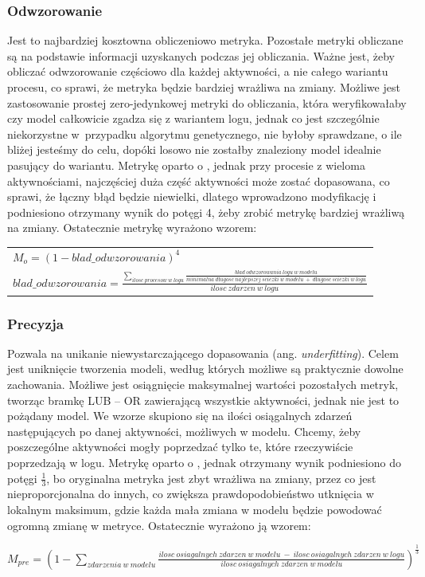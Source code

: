 \subsubsection{Odwzorowanie} 
Jest to najbardziej kosztowna obliczeniowo metryka. Pozostałe metryki obliczane są na podstawie informacji uzyskanych podczas jej obliczania. Ważne jest, żeby obliczać odwzorowanie częściowo dla każdej aktywności, a nie całego wariantu procesu, co sprawi, że metryka będzie bardziej wrażliwa na zmiany. Możliwe jest zastosowanie prostej zero-jedynkowej metryki do obliczania, która weryfikowałaby czy model całkowicie zgadza się z wariantem logu, jednak co jest szczególnie niekorzystne w~przypadku algorytmu genetycznego, nie byłoby sprawdzane, o ile bliżej jesteśmy do celu, dopóki losowo nie zostałby znaleziony model idealnie pasujący do wariantu. Metrykę oparto o \cite{metric-calculation}, jednak przy procesie z wieloma aktywnościami, najczęściej duża część aktywności może zostać dopasowana, co sprawi, że łączny błąd będzie niewielki, dlatego wprowadzono modyfikację i podniesiono otrzymany wynik do potęgi 4, żeby zrobić metrykę bardziej wrażliwą na zmiany. Ostatecznie metrykę wyrażono wzorem:
\begin{center}
\begin{tabular}{l}
$M_o = (1 - blad\_odwzorowania)^4$ \\
$blad\_odwzorowania = \frac{\sum_{ilosc\ procesow\ w\ logu} \frac{blad\ odwzorowania\ logu\ w\ modelu}{minimalna\ długosc\ najlepszej\ sciezki\ w\ modelu\ +\ długosc\ sciezki\ w\ logu}}{ilosc\ zdarzen \ w\ logu}$
\end{tabular}
\end{center}
\subsubsection{Precyzja} 
Pozwala na unikanie niewystarczającego dopasowania (ang. \textit{underfitting}). Celem jest uniknięcie tworzenia modeli, według których możliwe są praktycznie dowolne zachowania. Możliwe jest osiągnięcie maksymalnej wartości pozostałych metryk, tworząc bramkę LUB -- OR zawierającą wszystkie aktywności, jednak nie jest to pożądany model. We wzorze skupiono się na ilości osiągalnych zdarzeń następujących po danej aktywności, możliwych w modelu. Chcemy, żeby poszczególne aktywności mogły poprzedzać tylko te, które rzeczywiście poprzedzają w logu. Metrykę oparto o \cite{precision-calculation}, jednak otrzymany wynik podniesiono do potęgi $\frac{1}{3}$, bo oryginalna metryka jest zbyt wrażliwa na zmiany, przez co jest nieproporcjonalna do innych, co zwiększa prawdopodobieństwo utknięcia w lokalnym maksimum, gdzie każda mała zmiana w modelu będzie powodować ogromną zmianę w metryce. Ostatecznie wyrażono ją wzorem:
\begin{center}
$M_{pre} = (1 - \sum_{zdarzenia\ w\ modelu} \frac{ilosc\ osiagalnych\ zdarzen\ w\ modelu\ -\ ilosc\ osiagalnych\ zdarzen\ w\ logu}{ilosc\ osiagalnych\ zdarzen\ w\ modelu})^{\frac{1}{3}} $
\end{center}
